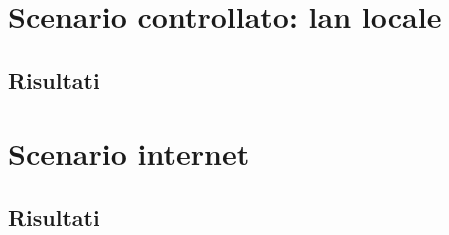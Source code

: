 \documentclass{article}
\begin{document}
    \section{Scenario controllato: lan locale}
    
    

    \subsection{Risultati}
    
    
    

    \section{Scenario internet}

    

    \subsection{Risultati}

    

    \pagebreak
    
    
    
\end{document}
